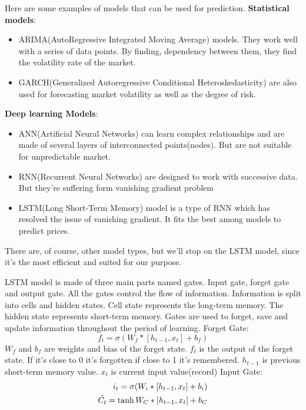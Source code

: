 \documentclass[10pt,twoside,english,a4paper]{article}
\begin{document}
Here are some examples of models that can be used for prediction.
\newline\textbf{Statistical models}:
\begin{itemize}
    \item  ARIMA(AutoRegressive Integrated Moving Average) models. They work well with a series of data points. By finding, dependency between them, they find the volatility rate of the market.
    \item GARCH(Generalized Autoregressive Conditional Heteroskedasticity) are also used for forecasting market volatility as well as the degree of risk.
\end{itemize}
\textbf{Deep learning Models}:
\begin{itemize}
    \item ANN(Artificial Neural Networks) can learn complex relationships and are made of several layers of interconnected points(nodes). But are not suitable for unpredictable market.
    \item RNN(Recurrent Neural Networks) are designed to work with successive data. But they're suffering form vanishing gradient problem
    \item LSTM(Long Short-Term Memory) model is a type of RNN which has resolved the issue of vanishing gradient. It fits the best among models to predict prices.
\end{itemize}
There are, of course, other model types, but we'll stop on the LSTM model, since it's the most efficient and suited for our purpose. 
\par LSTM model is made of three main parts named gates. Input gate, forget gate and output gate. All the gates control the flow of information. Information is split into cells and hidden states. Cell state represents the long-term memory. The hidden state represents short-term memory. Gates are used to forget, save and update information throughout the period of learning. 
\newline Forget Gate: 
\[f_{t} = \sigma (W_{f}*[h_{t-1}, x_{t}] + b_{f})\]
$W_{f}$ and $b_{f}$ are weights and bias of the forget state. $f_{t}$ is the output of the forget state. If it's close to 0 it's forgotten if close to 1 it's remembered. $h_{t-1}$ is previous short-term memory value. $x_t$ is current input value(record)
\newline Input Gate:
\begin{align*}
    i_{t} = \sigma(W_{i} * [h_{t-1}, x_{t}] + b_{i}) \\
    \Tilde{C_{t}} = \tanh{W_{C}*[h_{t-1}, x_{t}] + b_{C}}
\end{align*}
\end{document}

